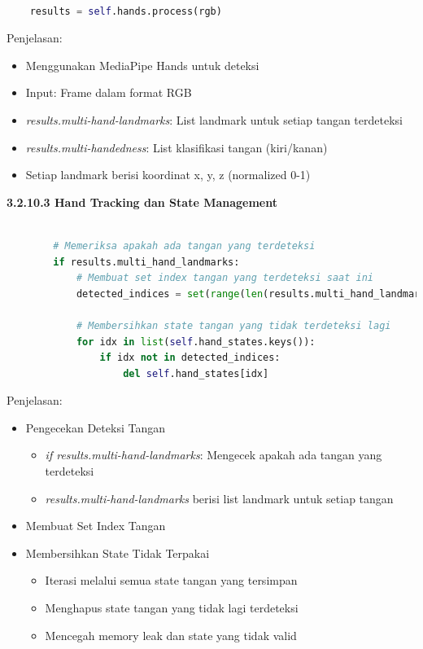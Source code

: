 \documentclass[11pt,a4paper]{article}
\begin{document}
    \begin{lstlisting}[language=Python, caption=Deteksi Tangan]
    
    results = self.hands.process(rgb)
    \end{lstlisting}
    Penjelasan:
    \begin{itemize}
        \item Menggunakan MediaPipe Hands untuk deteksi
        \item Input: Frame dalam format RGB
        \item \textit{results.multi-hand-landmarks}: List landmark untuk setiap tangan terdeteksi
        \item \textit{results.multi-handedness}: List klasifikasi tangan (kiri/kanan)
        \item Setiap landmark berisi koordinat x, y, z (normalized 0-1)
    \end{itemize}

    \noindent\textbf{3.2.10.3 Hand Tracking dan State Management}
    \begin{lstlisting}[language=Python, caption=Hand Tracking dan State Management]
    
        # Memeriksa apakah ada tangan yang terdeteksi
        if results.multi_hand_landmarks:
            # Membuat set index tangan yang terdeteksi saat ini
            detected_indices = set(range(len(results.multi_hand_landmarks)))
            
            # Membersihkan state tangan yang tidak terdeteksi lagi
            for idx in list(self.hand_states.keys()):
                if idx not in detected_indices:
                    del self.hand_states[idx]
    \end{lstlisting}
    Penjelasan:
    \begin{itemize}
        \item Pengecekan Deteksi Tangan
        \begin{itemize}
            \item \textit{if results.multi-hand-landmarks}: Mengecek apakah ada tangan yang terdeteksi
            \item \textit{results.multi-hand-landmarks} berisi list landmark untuk setiap tangan
        \end{itemize}
        \item Membuat Set Index Tangan
        \item Membersihkan State Tidak Terpakai
        \begin{itemize}
            \item Iterasi melalui semua state tangan yang tersimpan
            \item Menghapus state tangan yang tidak lagi terdeteksi
            \item Mencegah memory leak dan state yang tidak valid
        \end{itemize}
    \end{itemize}
    
\end{document}
